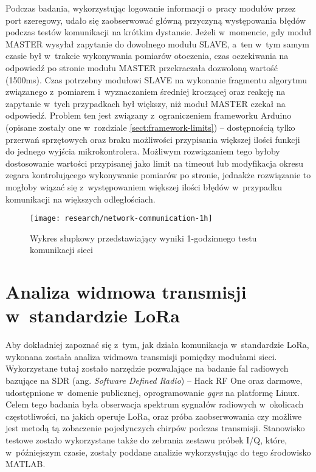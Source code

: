 Podczas badania, wykorzystując logowanie informacji o~pracy modułów przez port szeregowy, udało się zaobserwować główną
przyczyną występowania błędów podczas testów komunikacji na krótkim dystansie. Jeżeli w~momencie, gdy moduł MASTER
wysyłał zapytanie do dowolnego modułu SLAVE, a~ten w~tym samym czasie był w~trakcie wykonywania pomiarów otoczenia, czas
oczekiwania na odpowiedź po stronie modułu MASTER przekraczała dozwoloną wartość (1500ms). Czas potrzebny modułowi SLAVE
na wykonanie fragmentu algorytmu związanego z~pomiarem i~wyznaczaniem średniej kroczącej oraz reakcję na zapytanie
w~tych przypadkach był większy, niż moduł MASTER czekał na odpowiedź. Problem ten jest związany z~ograniczeniem
frameworku Arduino (opisane zostały one w~rozdziale \ref{sect:framework-limits}) -- dostępnością tylko przerwań
sprzętowych oraz braku możliwości przypisania większej ilości funkcji do jednego wyjścia mikrokontrolera. Możliwym
rozwiązaniem tego byłoby dostosowanie wartości przypisanej jako limit na timeout lub modyfikacja okresu zegara
kontrolującego wykonywanie pomiarów po stronie, jednakże rozwiązanie to mogłoby wiązać się z~występowaniem większej
ilości błędów w~przypadku komunikacji na większych odległościach.

\begin{figure}[!htbp]
    \centering
    \texttt{[image: research/network-communication-1h]}
    \caption{\label{img:network-communication-1h}Wykres słupkowy przedstawiający wyniki 1-godzinnego testu komunikacji
        sieci}
\end{figure}

\FloatBarrier
\section{\label{sect:spectral-analisys}Analiza widmowa transmisji w~standardzie LoRa} Aby dokładniej zapoznać się z~tym,
jak działa komunikacja w~standardzie LoRa, wykonana została analiza widmowa transmisji pomiędzy modułami sieci.
Wykorzystane tutaj zostało narzędzie pozwalające na badanie fal radiowych bazujące na SDR (ang. \textsl{Software Defined
    Radio}) -- Hack RF One oraz darmowe, udostępnione w~domenie publicznej, oprogramowanie \textsl{gqrx} na platformę Linux.
Celem tego badania była obserwacja spektrum sygnałów radiowych w~okolicach częstotliwości, na jakich operuje LoRa, oraz
próba zaobserwowania czy możliwe jest metodą tą zobaczenie pojedynczych chirpów podczas transmisji. Stanowisko testowe
zostało wykorzystane także do zebrania zestawu próbek I/Q, które, w~późniejszym czasie, zostały poddane analizie
wykorzystując do tego środowisko MATLAB.

